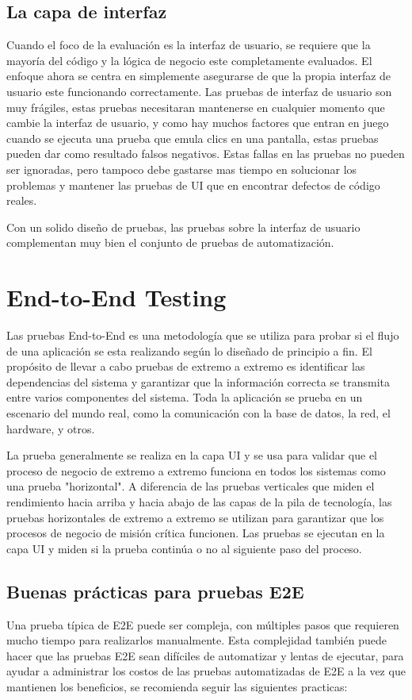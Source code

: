 \subsection{La capa de interfaz}
Cuando el foco de la evaluación es la interfaz de usuario, se requiere que la
mayoría del código y la lógica de negocio este completamente evaluados. El
enfoque ahora se centra en simplemente asegurarse de que la propia interfaz de
usuario este funcionando correctamente. Las pruebas de interfaz de usuario son
muy frágiles, estas pruebas necesitaran mantenerse en cualquier momento que
cambie la interfaz de usuario, y como hay muchos factores que entran en juego
cuando se ejecuta una prueba que emula clics en una pantalla, estas pruebas
pueden dar como resultado falsos negativos. Estas fallas en las pruebas no
pueden ser ignoradas, pero tampoco debe gastarse mas tiempo en solucionar los
problemas y mantener las pruebas de UI que en encontrar defectos de código
reales.

Con un solido diseño de pruebas, las pruebas sobre la interfaz de usuario
complementan muy bien el conjunto de pruebas de automatización.

\section{End-to-End Testing}
Las pruebas End-to-End es una metodología que se utiliza para probar si el flujo
de una aplicación se esta realizando según lo diseñado de principio a fin. El
propósito de llevar a cabo pruebas de extremo a extremo es identificar las
dependencias del sistema y garantizar que la información correcta se transmita
entre varios componentes del sistema. Toda la aplicación se prueba en un
escenario del mundo real, como la comunicación con la base de datos, la red, el
hardware, y otros.

La prueba generalmente se realiza en la capa UI y se usa para validar que el
proceso de negocio de extremo a extremo funciona en todos los sistemas como una
prueba "horizontal". A diferencia de las pruebas verticales que miden el
rendimiento hacia arriba y hacia abajo de las capas de la pila de tecnología,
las pruebas horizontales de extremo a extremo se utilizan para garantizar que
los procesos de negocio de misión crítica funcionen. Las pruebas se ejecutan en
la capa UI y miden si la prueba continúa o no al siguiente paso del proceso.

\subsection{Buenas prácticas para pruebas E2E}
Una prueba típica de E2E puede ser compleja, con múltiples pasos que requieren
mucho tiempo para realizarlos manualmente. Esta complejidad también puede hacer
que las pruebas E2E sean difíciles de automatizar y lentas de ejecutar, para
ayudar a administrar los costos de las pruebas automatizadas de E2E a la vez que
mantienen los beneficios, se recomienda seguir las siguientes practicas:

